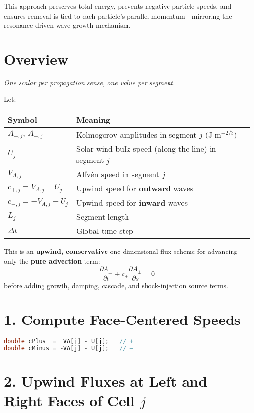\bigskip

\noindent This approach preserves total energy, prevents negative particle speeds, and ensures removal is tied to each particle's parallel momentum—mirroring the resonance-driven wave growth mechanism.


\section*{Overview}

\emph{One scalar per propagation sense, one value per segment.}

Let:

\begin{center}
\begin{tabular}{@{}ll@{}}
\toprule
\textbf{Symbol} & \textbf{Meaning} \\
\midrule
$A_{+,j},\,A_{-,j}$ & Kolmogorov amplitudes in segment $j$ (J m$^{-2/3}$) \\
$U_j$               & Solar-wind bulk speed (along the line) in segment $j$ \\
$V_{A,j}$           & Alfvén speed in segment $j$ \\
$c_{+,j}=V_{A,j}-U_j$ & Upwind speed for \textbf{outward} waves \\
$c_{-,j}=-V_{A,j}-U_j$ & Upwind speed for \textbf{inward} waves \\
$L_j$               & Segment length \\
$\Delta t$          & Global time step \\
\bottomrule
\end{tabular}
\end{center}

This is an \textbf{upwind, conservative} one-dimensional flux scheme for advancing only the \textbf{pure advection} term:
\[
\frac{\partial A_\pm}{\partial t} + c_\pm \frac{\partial A_\pm}{\partial s} = 0
\]
before adding growth, damping, cascade, and shock-injection source terms.

\section*{1. Compute Face-Centered Speeds}

\begin{lstlisting}[language=C++,basicstyle=\ttfamily\footnotesize]
double cPlus  =  VA[j] - U[j];   // +
double cMinus = -VA[j] - U[j];   // –
\end{lstlisting}

\section*{2. Upwind Fluxes at Left and Right Faces of Cell $j$}

